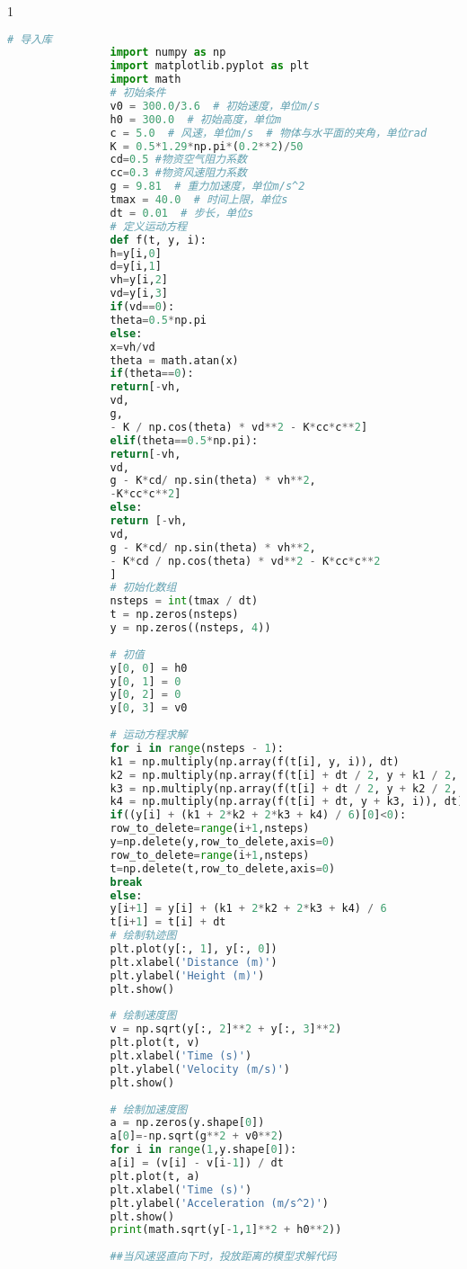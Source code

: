 \documentclass[normalsize]{ctexart}
\begin{document}
\begin{spacing}{1}
\begin{lstlisting}[language={Python}]
				# 导入库
				import numpy as np
				import matplotlib.pyplot as plt
				import math
				# 初始条件
				v0 = 300.0/3.6  # 初始速度，单位m/s
				h0 = 300.0  # 初始高度，单位m
				c = 5.0  # 风速，单位m/s  # 物体与水平面的夹角，单位rad
				K = 0.5*1.29*np.pi*(0.2**2)/50
				cd=0.5 #物资空气阻力系数
				cc=0.3 #物资风速阻力系数
				g = 9.81  # 重力加速度，单位m/s^2
				tmax = 40.0  # 时间上限，单位s
				dt = 0.01  # 步长，单位s
				# 定义运动方程
				def f(t, y, i):
				h=y[i,0]
				d=y[i,1]
				vh=y[i,2]
				vd=y[i,3]
				if(vd==0):
				theta=0.5*np.pi
				else:
				x=vh/vd
				theta = math.atan(x)
				if(theta==0):
				return[-vh,
				vd,
				g,
				- K / np.cos(theta) * vd**2 - K*cc*c**2]
				elif(theta==0.5*np.pi):
				return[-vh,
				vd,
				g - K*cd/ np.sin(theta) * vh**2,
				-K*cc*c**2]
				else:
				return [-vh,
				vd,
				g - K*cd/ np.sin(theta) * vh**2,
				- K*cd / np.cos(theta) * vd**2 - K*cc*c**2
				]
				# 初始化数组
				nsteps = int(tmax / dt)
				t = np.zeros(nsteps)
				y = np.zeros((nsteps, 4))
				
				# 初值
				y[0, 0] = h0
				y[0, 1] = 0 
				y[0, 2] = 0
				y[0, 3] = v0
				
				# 运动方程求解
				for i in range(nsteps - 1):
				k1 = np.multiply(np.array(f(t[i], y, i)), dt)
				k2 = np.multiply(np.array(f(t[i] + dt / 2, y + k1 / 2, i)), dt)
				k3 = np.multiply(np.array(f(t[i] + dt / 2, y + k2 / 2, i)), dt)
				k4 = np.multiply(np.array(f(t[i] + dt, y + k3, i)), dt)
				if((y[i] + (k1 + 2*k2 + 2*k3 + k4) / 6)[0]<0):
				row_to_delete=range(i+1,nsteps)
				y=np.delete(y,row_to_delete,axis=0)
				row_to_delete=range(i+1,nsteps)
				t=np.delete(t,row_to_delete,axis=0)
				break
				else:
				y[i+1] = y[i] + (k1 + 2*k2 + 2*k3 + k4) / 6
				t[i+1] = t[i] + dt
				# 绘制轨迹图
				plt.plot(y[:, 1], y[:, 0])
				plt.xlabel('Distance (m)')
				plt.ylabel('Height (m)')
				plt.show()
				
				# 绘制速度图
				v = np.sqrt(y[:, 2]**2 + y[:, 3]**2)
				plt.plot(t, v)
				plt.xlabel('Time (s)')
				plt.ylabel('Velocity (m/s)')
				plt.show()
				
				# 绘制加速度图
				a = np.zeros(y.shape[0])
				a[0]=-np.sqrt(g**2 + v0**2)
				for i in range(1,y.shape[0]):
				a[i] = (v[i] - v[i-1]) / dt
				plt.plot(t, a)
				plt.xlabel('Time (s)')
				plt.ylabel('Acceleration (m/s^2)')
				plt.show()
				print(math.sqrt(y[-1,1]**2 + h0**2))
				
				##当风速竖直向下时，投放距离的模型求解代码
				

\end{lstlisting}
\end{spacing}
\end{document}
